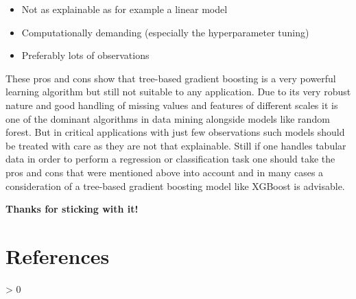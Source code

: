 \documentclass[
]{book}
\newlength{\cslhangindent}
\newenvironment{CSLReferences}[2] %
 {%
  \setlength{\parindent}{0pt}
  \ifodd #1 \everypar{\setlength{\hangindent}{\cslhangindent}}\ignorespaces\fi
  \ifnum #2 > 0
  \setlength{\parskip}{#2\baselineskip}
  \fi
 }%
 {}
\begin{document}
\begin{itemize}
\item
  Not as explainable as for example a linear model
\item
  Computationally demanding (especially the hyperparameter tuning)
\item
  Preferably lots of observations
\end{itemize}

These pros and cons show that tree-based gradient boosting is a very powerful learning algorithm but still not suitable to any application. Due to its very robust nature and good handling of missing values and features of different scales it is one of the dominant algorithms in data mining alongside models like random forest. But in critical applications with just few observations such models should be treated with care as they are not that explainable. Still if one handles tabular data in order to perform a regression or classification task one should take the pros and cons that were mentioned above into account and in many cases a consideration of a tree-based gradient boosting model like XGBoost is advisable.

\textbf{Thanks for sticking with it!}

\hypertarget{references}{%
\chapter{References}\label{references}}

\hypertarget{refs}{}
\begin{CSLReferences}{0}{0}
\end{CSLReferences}

  
\end{document}
